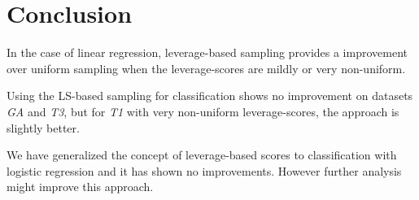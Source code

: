 \documentclass{article}
\begin{document}
\newpage
%
\section{Conclusion}
In the case of linear regression, leverage-based sampling provides a improvement over uniform sampling when the leverage-scores are mildly or very non-uniform.

Using the LS-based sampling for classification shows no improvement on datasets \emph{GA} and \emph{T3}, but for \emph{T1} with very non-uniform leverage-scores, the approach is slightly better.

We have generalized the concept of leverage-based scores to classification with logistic regression and it has shown no improvements. However further analysis might improve this approach.



\end{document}
